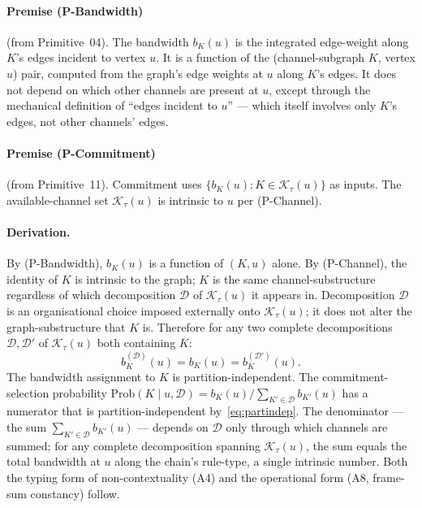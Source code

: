 \documentclass[11pt,a4paper]{article}
\begin{document}
\paragraph{Premise (P-Bandwidth)} (from Primitive~04). The bandwidth $b_K(u)$ is the integrated edge-weight along $K$'s edges incident to vertex $u$. It is a function of the (channel-subgraph $K$, vertex $u$) pair, computed from the graph's edge weights at $u$ along $K$'s edges. It does not depend on which other channels are present at $u$, except through the mechanical definition of ``edges incident to $u$'' --- which itself involves only $K$'s edges, not other channels' edges.

\paragraph{Premise (P-Commitment)} (from Primitive~11). Commitment uses $\{b_K(u) : K \in \mathcal{K}_\tau(u)\}$ as inputs. The available-channel set $\mathcal{K}_\tau(u)$ is intrinsic to $u$ per (P-Channel).

\paragraph{Derivation.} By (P-Bandwidth), $b_K(u)$ is a function of $(K, u)$ alone. By (P-Channel), the identity of $K$ is intrinsic to the graph; $K$ is the same channel-substructure regardless of which decomposition $\mathcal{D}$ of $\mathcal{K}_\tau(u)$ it appears in. Decomposition $\mathcal{D}$ is an organisational choice imposed externally onto $\mathcal{K}_\tau(u)$; it does not alter the graph-substructure that $K$ is. Therefore for any two complete decompositions $\mathcal{D}, \mathcal{D}'$ of $\mathcal{K}_\tau(u)$ both containing $K$:
\begin{equation}
b_K^{(\mathcal{D})}(u) = b_K(u) = b_K^{(\mathcal{D}')}(u).
\label{eq:partindep}
\end{equation}
The bandwidth assignment to $K$ is partition-independent. The commitment-selection probability $\mathrm{Prob}(K \mid u, \mathcal{D}) = b_K(u) / \sum_{K' \in \mathcal{D}} b_{K'}(u)$ has a numerator that is partition-independent by~\eqref{eq:partindep}. The denominator --- the sum $\sum_{K' \in \mathcal{D}} b_{K'}(u)$ --- depends on $\mathcal{D}$ only through which channels are summed; for any complete decomposition spanning $\mathcal{K}_\tau(u)$, the sum equals the total bandwidth at $u$ along the chain's rule-type, a single intrinsic number. Both the typing form of non-contextuality (A4) and the operational form (A8, frame-sum constancy) follow.
\end{document}
